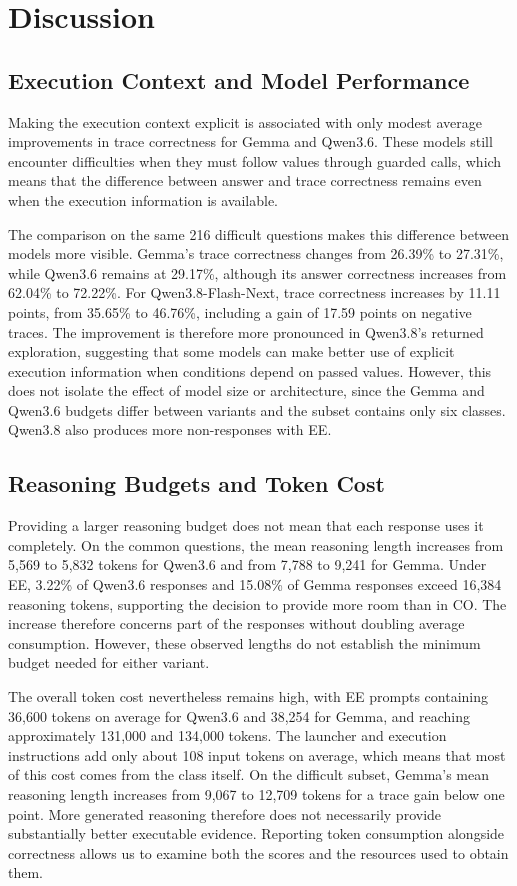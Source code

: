 \section{Discussion}
\label{sec:error-analysis}

\subsection{Execution Context and Model Performance}

Making the execution context explicit is associated with only modest average improvements in trace correctness for Gemma and Qwen3.6. These models still encounter difficulties when they must follow values through guarded calls, which means that the difference between answer and trace correctness remains even when the execution information is available.

The comparison on the same 216 difficult questions makes this difference between models more visible. Gemma's trace correctness changes from 26.39\% to 27.31\%, while Qwen3.6 remains at 29.17\%, although its answer correctness increases from 62.04\% to 72.22\%. For Qwen3.8-Flash-Next, trace correctness increases by 11.11 points, from 35.65\% to 46.76\%, including a gain of 17.59 points on negative traces. The improvement is therefore more pronounced in Qwen3.8's returned exploration, suggesting that some models can make better use of explicit execution information when conditions depend on passed values. However, this does not isolate the effect of model size or architecture, since the Gemma and Qwen3.6 budgets differ between variants and the subset contains only six classes. Qwen3.8 also produces more non-responses with EE.

\subsection{Reasoning Budgets and Token Cost}

Providing a larger reasoning budget does not mean that each response uses it completely. On the common questions, the mean reasoning length increases from 5,569 to 5,832 tokens for Qwen3.6 and from 7,788 to 9,241 for Gemma. Under EE, 3.22\% of Qwen3.6 responses and 15.08\% of Gemma responses exceed 16,384 reasoning tokens, supporting the decision to provide more room than in CO. The increase therefore concerns part of the responses without doubling average consumption. However, these observed lengths do not establish the minimum budget needed for either variant.

The overall token cost nevertheless remains high, with EE prompts containing 36,600 tokens on average for Qwen3.6 and 38,254 for Gemma, and reaching approximately 131,000 and 134,000 tokens. The launcher and execution instructions add only about 108 input tokens on average, which means that most of this cost comes from the class itself. On the difficult subset, Gemma's mean reasoning length increases from 9,067 to 12,709 tokens for a trace gain below one point. More generated reasoning therefore does not necessarily provide substantially better executable evidence. Reporting token consumption alongside correctness allows us to examine both the scores and the resources used to obtain them.
